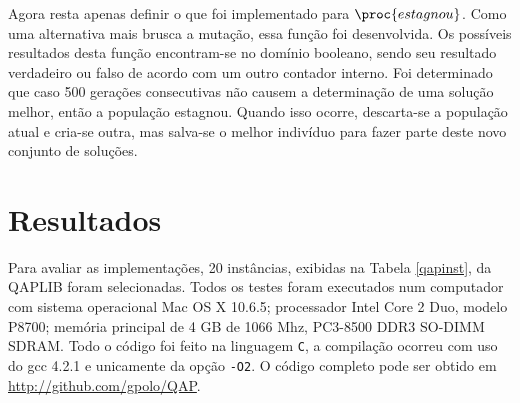 Agora resta apenas definir o que foi implementado para
$\proc{estagnou}$. Como uma alternativa mais brusca a mutação, essa
função foi desenvolvida. Os possíveis resultados desta função
encontram-se no domínio booleano, sendo seu resultado verdadeiro ou
falso de acordo com um outro contador interno. Foi determinado que
caso 500 gerações consecutivas não causem a determinação de uma
solução melhor, então a população estagnou. Quando isso ocorre,
descarta-se a população atual e cria-se outra, mas salva-se o
melhor indivíduo para fazer parte deste novo conjunto de soluções.


\section{Resultados}

Para avaliar as implementações, 20 instâncias, exibidas na Tabela
\ref{qapinst}, da QAPLIB \cite{qaplib} foram selecionadas. Todos os
testes foram executados num computador com sistema operacional Mac OS
X 10.6.5; processador Intel Core 2 Duo, modelo P8700; memória
principal de 4 GB de 1066 Mhz, PC3-8500 DDR3 SO-DIMM SDRAM. Todo o
código foi feito na linguagem \texttt{C}, a compilação ocorreu com uso
do gcc 4.2.1 e unicamente da opção \verb!-O2!. O código completo pode
ser obtido em \url{http://github.com/gpolo/QAP}.

